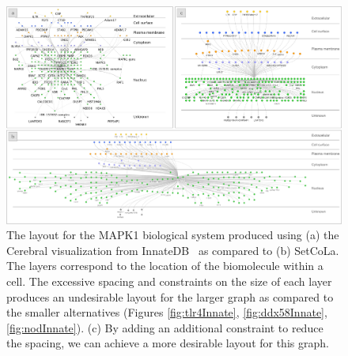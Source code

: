 \documentclass{egpubl}
\begin{document}
\begin{figure}[t]
  \centering
  \includegraphics[width=\textwidth]{figures/innatedb-mapk1.pdf}
  \vspace{-15px} {\caption{\label{fig:mapk1Innate} 
    The layout for the MAPK1 biological system produced using 
    (a) the Cerebral visualization from InnateDB~\cite{innatedb:mapk1}
    as compared to (b) SetCoLa. The layers correspond to the 
    location of the biomolecule within a cell. The excessive spacing
    and constraints on the size of each layer produces an undesirable
    layout for the larger graph as compared to the smaller alternatives
    (Figures \ref{fig:tlr4Innate}, \ref{fig:ddx58Innate}, \ref{fig:nodInnate}).
    (c) By adding an additional constraint to reduce the spacing, we can
    achieve a more desirable layout for this graph.
  }}
\end{figure}


%


\end{document}
